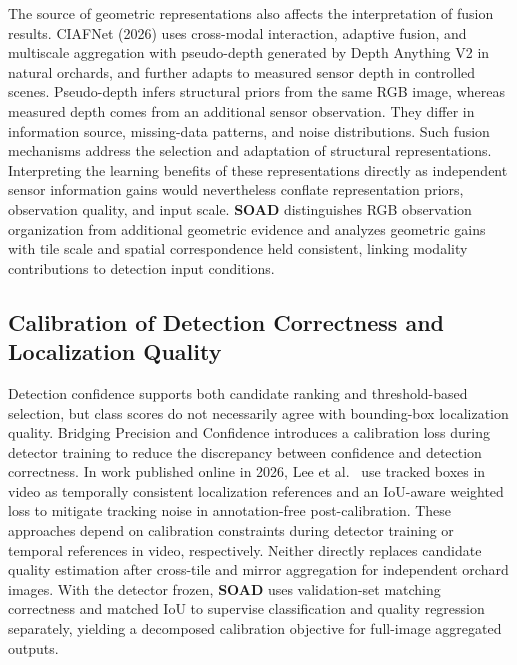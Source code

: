 \documentclass[11pt,a4paper]{article}
\begin{document}
The source of geometric representations also affects the interpretation of fusion results. CIAFNet (2026) \cite{ciafnet} uses cross-modal interaction, adaptive fusion, and multiscale aggregation with pseudo-depth generated by Depth Anything V2 in natural orchards, and further adapts to measured sensor depth in controlled scenes. Pseudo-depth infers structural priors from the same RGB image, whereas measured depth comes from an additional sensor observation. They differ in information source, missing-data patterns, and noise distributions. Such fusion mechanisms address the selection and adaptation of structural representations. Interpreting the learning benefits of these representations directly as independent sensor information gains would nevertheless conflate representation priors, observation quality, and input scale. \textbf{SOAD} distinguishes RGB observation organization from additional geometric evidence and analyzes geometric gains with tile scale and spatial correspondence held consistent, linking modality contributions to detection input conditions.

\subsection{Calibration of Detection Correctness and Localization Quality}
Detection confidence supports both candidate ranking and threshold-based selection, but class scores do not necessarily agree with bounding-box localization quality. Bridging Precision and Confidence \cite{bpc} introduces a calibration loss during detector training to reduce the discrepancy between confidence and detection correctness. In work published online in 2026, Lee et al.\ \cite{trackcal} use tracked boxes in video as temporally consistent localization references and an IoU-aware weighted loss to mitigate tracking noise in annotation-free post-calibration. These approaches depend on calibration constraints during detector training or temporal references in video, respectively. Neither directly replaces candidate quality estimation after cross-tile and mirror aggregation for independent orchard images. With the detector frozen, \textbf{SOAD} uses validation-set matching correctness and matched IoU to supervise classification and quality regression separately, yielding a decomposed calibration objective for full-image aggregated outputs.
\end{document}
